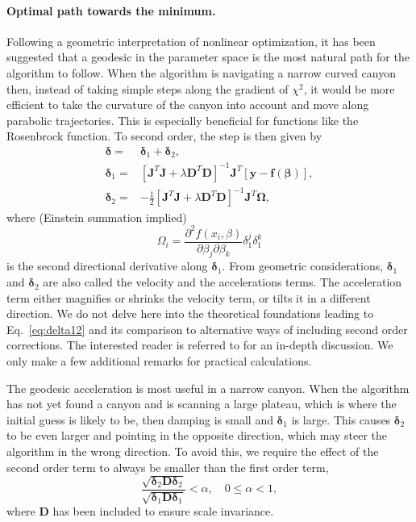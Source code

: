 \documentclass{article}
\begin{document}
\paragraph{Optimal path towards the minimum.} Following a geometric interpretation of nonlinear optimization, it has been suggested that a geodesic in the parameter space is the most natural path for the algorithm to follow. When the algorithm is navigating a narrow curved canyon then, instead of taking simple steps along the gradient of $\chi^2$, it would be more efficient to take the curvature of the canyon into account and move along parabolic trajectories. This is especially beneficial for functions like the Rosenbrock function. To second order, the step is then given by
\begin{equation}
  \label{eq:delta12}
  \begin{split}
    \bm\delta =& \bm\delta_1 + \bm\delta_2, \\
    \bm\delta_1 =& \left[ \bm J^T \bm J + \lambda\bm D^T\bm D
    \right]^{-1} \bm J^T \left[ \bm y - \bm f(\bm\beta) \right], \\
    \bm\delta_2 =& -\frac{1}{2} \left[ \bm J^T \bm J + \lambda\bm
      D^T\bm D\right]^{-1} \bm J^T \bm\Omega,
  \end{split}
\end{equation}
where (Einstein summation implied)
\begin{equation}
  \label{eq:omega}
  \Omega_i = \frac{\partial^2
    f(x_i,\beta)}{\partial\beta_j \partial\beta_k} \delta_1^j
  \delta_1^k
\end{equation}
is the second directional derivative along $\bm\delta_1$. From geometric considerations, $\bm\delta_1$ and $\bm\delta_2$ are also called the velocity and the accelerations terms. The acceleration term either magnifies or shrinks the velocity term, or tilts it in a different direction. We do not delve here into the theoretical foundations leading to Eq.~\eqref{eq:delta12} and its comparison to alternative ways of including second order corrections. The interested reader is referred to \cite{transtrum10, transtrum11, transtrum12} for an in-depth discussion. We only make a few additional remarks for practical calculations.

The geodesic acceleration is most useful in a narrow canyon. When the algorithm has not yet found a canyon and is scanning a large plateau, which is where the initial guess is likely to be, then damping is small and $\bm\delta_1$ is large. This causes $\bm\delta_2$ to be even larger and pointing in the opposite direction, which may steer the algorithm in the wrong direction. To avoid this, we require the effect of the second order term to always be smaller than the first order term,
\begin{equation}
  \label{eq:acc_alpha}
  \frac{\sqrt{\bm\delta_2\bm D\bm\delta_2}}{\sqrt{\bm\delta_1\bm
      D\bm\delta_1}} < \alpha, \quad 0 \le \alpha < 1,
\end{equation}
where $\bm D$ has been included to ensure scale invariance.
\end{document}
